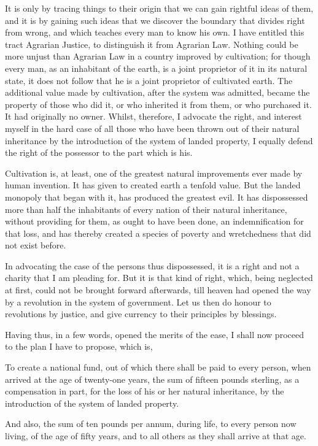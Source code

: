 It is only by tracing things to their origin that we can gain rightful ideas of them, and it is by gaining such ideas that we discover the boundary that divides right from wrong, and which teaches every man to know his own. I have entitled this tract Agrarian Justice, to distinguish it from Agrarian Law. Nothing could be more unjust than Agrarian Law in a country improved by cultivation; for though every man, as an inhabitant of the earth, is a joint proprietor of it in its natural state, it does not follow that he is a joint proprietor of cultivated earth. The additional value made by cultivation, after the system was admitted, became the property of those who did it, or who inherited it from them, or who purchased it. It had originally no owner. Whilst, therefore, I advocate the right, and interest myself in the hard case of all those who have been thrown out of their natural inheritance by the introduction of the system of landed property, I equally defend the right of the possessor to the part which is his.

Cultivation is, at least, one of the greatest natural improvements ever made by human invention. It has given to created earth a tenfold value. But the landed monopoly that began with it, has produced the greatest evil. It has dispossessed more than half the inhabitants of every nation of their natural inheritance, without providing for them, as ought to have been done, an indemnification for that loss, and has thereby created a species of poverty and wretchedness that did not exist before.

In advocating the case of the persons thus dispossessed, it is a right and not a charity that I am pleading for. But it is that kind of right, which, being neglected at first, could not be brought forward afterwards, till heaven had opened the way by a revolution in the system of government. Let us then do honour to revolutions by justice, and give currency to their principles by blessings.

Having thus, in a few words, opened the merits of the ease, I shall now proceed to the plan I have to propose, which is,

To create a national fund, out of which there shall be paid to every person, when arrived at the age of twenty-one years, the sum of fifteen pounds sterling, as a compensation in part, for the loss of his or her natural inheritance, by the introduction of the system of landed property.

And also, the sum of ten pounds per annum, during life, to every person now living, of the age of fifty years, and to all others as they shall arrive at that age.

